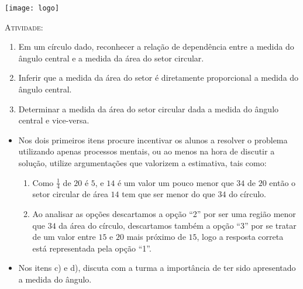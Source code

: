 \documentclass[10 pt,usenames,dvipsnames, oneside]{article}
\begin{document}
\begin{center}
  \begin{minipage}[l]{3cm}
\texttt{[image: logo]}    
\end{minipage}\hfill
\begin{minipage}[r]{.8\textwidth}
 {\Large \scshape Atividade: }  
\end{minipage}
\end{center}
\vspace{.2cm}

\ifdefined\prof
\begin{objetivos}
\item \phantom{a}
\end{objetivos}

\begin{goals}
\begin{enumerate}
\item Em um círculo dado, reconhecer a relação de dependência entre a medida do ângulo central e a medida da área do setor circular.

\item Inferir que a medida da área do setor é diretamente proporcional a medida do ângulo central.

\item Determinar a medida da área do setor circular dada a medida do ângulo central e vice-versa.

\end{enumerate}

\tcblower

\begin{itemize}
\item Nos dois primeiros itens procure incentivar os alunos a resolver o problema utilizando apenas processos mentais, ou ao menos na hora de discutir a solução, utilize argumentações que valorizem a estimativa, tais como:

\begin{enumerate}
\item Como $\frac{1}{4}$ de $20$ é $5$, e $14$ é um valor um pouco menor que $34$ de $20$ então o setor circular de área $14$ tem que ser menor do que $34$ do círculo.

\item Ao analisar as opções descartamos a opção “2” por ser uma região menor que $34$ da área do círculo, descartamos também a opção “3” por se tratar de um valor entre $15$ e $20$ mais próximo de $15$, logo a resposta correta está representada pela opção “1”.
\end{enumerate}

\item Nos itens c) e d), discuta com a turma a importância de ter sido apresentado a medida do ângulo.
\end{itemize}
\end{goals}
\end{document}
